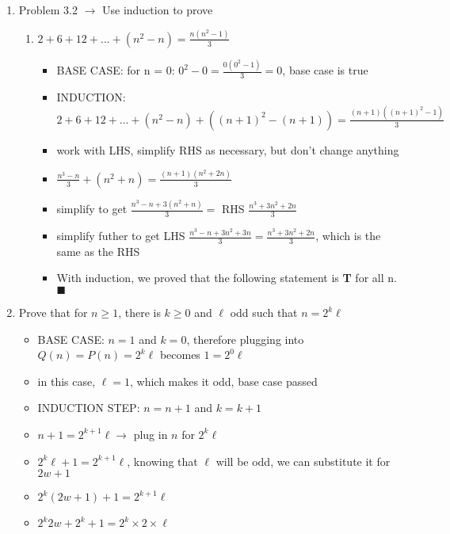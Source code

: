 \documentclass[11pt]{article}
\begin{document}
\begin{enumerate}
\begin{enumerate}
\begin{itemize}
            \end{itemize}
        \end{enumerate}
        \item Problem 3.2 $\rightarrow$ Use induction to prove
        \begin{enumerate}
            \item $2 + 6 + 12 + ... + (n^2 - n) = \frac{n(n^2-1)}{3}$
            \begin{itemize}
                \item BASE CASE: for n = 0: $0^2 - 0 = \frac{0(0^2-1)}{3} = 0$, base case is true
                \item INDUCTION: $2 +6 + 12 + ... + (n^2 - n) + ((n+1)^2-(n+1)) = \frac{(n+1)((n+1)^2-1)}{3}$
                \item work with LHS, simplify RHS as necessary, but don't change anything
                \item $\frac{n^3 - n}{3} + (n^2 + n) = \frac{(n+1)(n^2 + 2n)}{3}$
                \item simplify to get $\frac{n^3 -n + 3(n^2+n)}{3} = $ RHS $\frac{n^3 + 3n^2 + 2n}{3}$
                \item simplify futher to get LHS $\frac{n^3 - n + 3n^2 + 3n}{3} = \frac{n^3 + 3n^2 + 2n}{3}$, which is the same as the RHS
                \item With induction, we proved that the following statement is \textbf{T} for all n. $\blacksquare$
            \end{itemize}
        \end{enumerate}
        \item Prove that for $n \geq 1$, there is $k \geq 0$ and $\ell$ odd such that $n = 2^k\ell$
        \begin{itemize}
            \item BASE CASE: $n = 1$ and $k = 0$, therefore plugging into $Q(n) = P(n) = 2^k\ell$ becomes $1 = 2^0\ell$
            \item in this case, $\ell = 1$, which makes it odd, base case passed
            \item INDUCTION STEP: $n = n+1$ and $k = k + 1$
            \item $n + 1 = 2 ^ {k+1} \ell \rightarrow$ plug in $n$ for $2^k\ell$
            \item $2^k\ell + 1 = 2^{k+1}\ell$, knowing that $\ell$ will be odd, we can substitute it for $2w + 1$
            \item $2^k(2w+1) + 1 = 2^{k+1}\ell$
            \item $2^k2w+2^k+1 = 2^k\times2\times\ell$
        \end{itemize}
    \end{enumerate}
\end{document}
